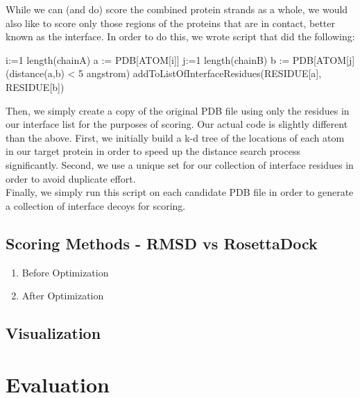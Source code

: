 \documentclass{article}
\begin{document}
While we can (and do) score the combined protein strands as a whole, we would also like to score only those regions of the proteins that are in contact, better known as the interface.  In order to do this, we wrote script that did the following:\\

\begin{program}
  \FOR i:=1 \TO length(chainA)  \DO
	a := PDB[ATOM[i]]
    \FOR j:=1 \TO length(chainB)  \DO
	b := PDB[ATOM[j]
    \IF (distance(a,b) < 5 angstrom) \DO
addToListOfInterfaceResidues(RESIDUE[a], RESIDUE[b])
    \END
   \END
\END
\end{program}

Then, we simply create a copy of the original PDB file using only the residues in our interface list for the purposes of scoring.  Our actual code is slightly different than the above.  First, we initially build a k-d tree of the locations of each atom in our target protein in order to speed up the distance search process significantly.  Second, we use a unique set for our collection of interface residues in order to avoid duplicate effort.\\

Finally, we simply run this script on each candidate PDB file in order to generate a collection of interface decoys for scoring.

\subsection{Scoring Methods - RMSD vs RosettaDock}

\begin{enumerate}

\item Before Optimization



\item After Optimization



\end{enumerate}

\subsection{Visualization}



\section{Evaluation}
\end{document}
